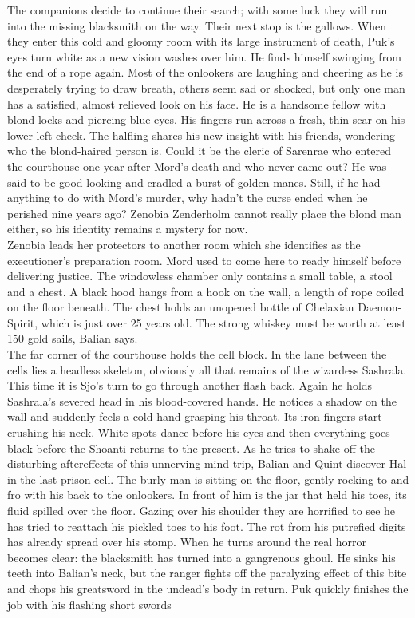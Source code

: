 The companions decide to continue their search; with some luck they will run into the missing blacksmith on the way. Their next stop is the gallows. When they enter this cold and gloomy room with its large instrument of death, Puk's eyes turn white as a new vision washes over him. He finds himself swinging from the end of a rope again. Most of the onlookers are laughing and cheering as he is desperately trying to draw breath, others seem sad or shocked, but only one man has a satisfied, almost relieved look on his face. He is a handsome fellow with blond locks and piercing blue eyes. His fingers run across a fresh, thin scar on his lower left cheek. The halfling shares his new insight with his friends, wondering who the blond-haired person is. Could it be the cleric of Sarenrae who entered the courthouse one year after Mord's death and who never came out? He was said to be good-looking and cradled a burst of golden manes. Still, if he had anything to do with Mord's murder, why hadn't the curse ended when he perished nine years ago? Zenobia Zenderholm cannot really place the blond man either, so his identity remains a mystery for now.\\

Zenobia leads her protectors to another room which she identifies as the executioner's preparation room. Mord used to come here to ready himself before delivering justice. The windowless chamber only contains a small table, a stool and a chest. A black hood hangs from a hook on the wall, a length of rope coiled on the floor beneath. The chest holds an unopened bottle of Chelaxian Daemon-Spirit, which is just over 25 years old. The strong whiskey must be worth at least 150 gold sails, Balian says.\\

The far corner of the courthouse holds the cell block. In the lane between the cells lies a headless skeleton, obviously all that remains of the wizardess Sashrala. This time it is Sjo's turn to go through another flash back. Again he holds Sashrala's severed head in his blood-covered hands. He notices a shadow on the wall and suddenly feels a cold hand grasping his throat. Its iron fingers start crushing his neck. White spots dance before his eyes and then everything goes black before the Shoanti returns to the present. As he tries to shake off the disturbing aftereffects of this unnerving mind trip, Balian and Quint discover Hal in the last prison cell. The burly man is sitting on the floor, gently rocking to and fro with his back to the onlookers. In front of him is the jar that held his toes, its fluid spilled over the floor. Gazing over his shoulder they are horrified to see he has tried to reattach his pickled toes to his foot. The rot from his putrefied digits has already spread over his stomp. When he turns around the real horror becomes clear: the blacksmith has turned into a gangrenous ghoul. He sinks his teeth into Balian's neck, but the ranger fights off the paralyzing effect of this bite and chops his greatsword in the undead's body in return. Puk quickly finishes the job with his flashing short swords\\

